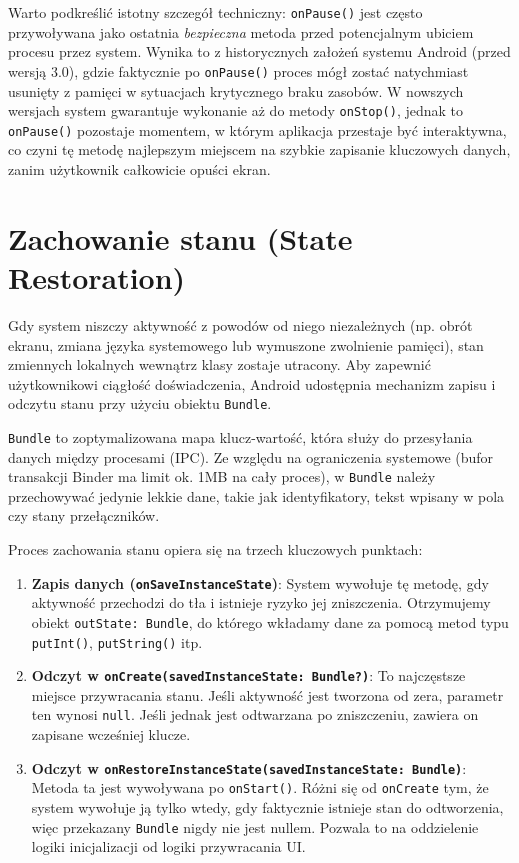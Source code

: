 Warto podkreślić istotny szczegół techniczny: \texttt{onPause()} jest często przywoływana jako ostatnia \textit{bezpieczna} metoda przed potencjalnym ubiciem procesu przez system. Wynika to z historycznych założeń systemu Android (przed wersją 3.0), gdzie faktycznie po \texttt{onPause()} proces mógł zostać natychmiast usunięty z pamięci w sytuacjach krytycznego braku zasobów. W nowszych wersjach system gwarantuje wykonanie aż do metody \texttt{onStop()}, jednak to \texttt{onPause()} pozostaje momentem, w którym aplikacja przestaje być interaktywna, co czyni tę metodę najlepszym miejscem na szybkie zapisanie kluczowych danych, zanim użytkownik całkowicie opuści ekran.

\section{Zachowanie stanu (State Restoration)}

Gdy system niszczy aktywność z powodów od niego niezależnych (np. obrót ekranu, zmiana języka systemowego lub wymuszone zwolnienie pamięci), stan zmiennych lokalnych wewnątrz klasy zostaje utracony. Aby zapewnić użytkownikowi ciągłość doświadczenia, Android udostępnia mechanizm zapisu i odczytu stanu przy użyciu obiektu \texttt{Bundle}.

\texttt{Bundle} to zoptymalizowana mapa klucz-wartość, która służy do przesyłania danych między procesami (IPC). Ze względu na ograniczenia systemowe (bufor transakcji Binder ma limit ok. 1MB na cały proces), w \texttt{Bundle} należy przechowywać jedynie lekkie dane, takie jak identyfikatory, tekst wpisany w pola czy stany przełączników.

Proces zachowania stanu opiera się na trzech kluczowych punktach:

\begin{enumerate}
    \item \textbf{Zapis danych (\texttt{onSaveInstanceState})}: System wywołuje tę metodę, gdy aktywność przechodzi do tła i istnieje ryzyko jej zniszczenia. Otrzymujemy obiekt \texttt{outState: Bundle}, do którego wkładamy dane za pomocą metod typu \texttt{putInt()}, \texttt{putString()} itp.
    \item \textbf{Odczyt w \texttt{onCreate(savedInstanceState: Bundle?)}}: To najczęstsze miejsce przywracania stanu. Jeśli aktywność jest tworzona od zera, parametr ten wynosi \texttt{null}. Jeśli jednak jest odtwarzana po zniszczeniu, zawiera on zapisane wcześniej klucze.
    \item \textbf{Odczyt w \texttt{onRestoreInstanceState(savedInstanceState: Bundle)}}: Metoda ta jest wywoływana po \texttt{onStart()}. Różni się od \texttt{onCreate} tym, że system wywołuje ją tylko wtedy, gdy faktycznie istnieje stan do odtworzenia, więc przekazany \texttt{Bundle} nigdy nie jest nullem. Pozwala to na oddzielenie logiki inicjalizacji od logiki przywracania UI.
\end{enumerate}

